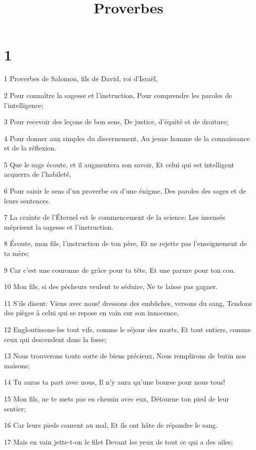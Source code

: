 

\title{Proverbes}


\chapter{1}

\par 1 Proverbes de Salomon, fils de David, roi d'Israël,
\par 2 Pour connaître la sagesse et l'instruction, Pour comprendre les paroles de l'intelligence;
\par 3 Pour recevoir des leçons de bon sens, De justice, d'équité et de droiture;
\par 4 Pour donner aux simples du discernement, Au jeune homme de la connaissance et de la réflexion.
\par 5 Que le sage écoute, et il augmentera son savoir, Et celui qui est intelligent acquerra de l'habileté,
\par 6 Pour saisir le sens d'un proverbe ou d'une énigme, Des paroles des sages et de leurs sentences.
\par 7 La crainte de l'Éternel est le commencement de la science; Les insensés méprisent la sagesse et l'instruction.
\par 8 Écoute, mon fils, l'instruction de ton père, Et ne rejette pas l'enseignement de ta mère;
\par 9 Car c'est une couronne de grâce pour ta tête, Et une parure pour ton cou.
\par 10 Mon fils, si des pécheurs veulent te séduire, Ne te laisse pas gagner.
\par 11 S'ils disent: Viens avec nous! dressons des embûches, versons du sang, Tendons des pièges à celui qui se repose en vain sur son innocence,
\par 12 Engloutissons-les tout vifs, comme le séjour des morts, Et tout entiers, comme ceux qui descendent dans la fosse;
\par 13 Nous trouverons toute sorte de biens précieux, Nous remplirons de butin nos maisons;
\par 14 Tu auras ta part avec nous, Il n'y aura qu'une bourse pour nous tous!
\par 15 Mon fils, ne te mets pas en chemin avec eux, Détourne ton pied de leur sentier;
\par 16 Car leurs pieds courent au mal, Et ils ont hâte de répandre le sang.
\par 17 Mais en vain jette-t-on le filet Devant les yeux de tout ce qui a des ailes;
